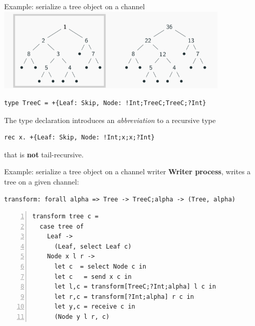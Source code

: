 \documentclass[10pt]{beamer}
\begin{document}
\begin{frame}[fragile]{Example:  serialize a tree object on a channel \hfill {}}
\pause
\vspace{-4cm}
\includegraphics[width=11cm]{img/treesumL}
\pause

\begin{lstlisting}
type TreeC = +{Leaf: Skip, Node: !Int;TreeC;TreeC;?Int}
\end{lstlisting}
The type declaration introduces an \emph{abbreviation} to a recursive
type
\begin{lstlisting}
rec x. +{Leaf: Skip, Node: !Int;x;x;?Int}
\end{lstlisting}
that is \textbf{not} tail-recursive.
\end{frame}

\newcommand\hlmarkerstyle[5][yellow]{%
    \draw [ line width = \baselineskip, #1 ] (#2, #3) -- (#4, #5);
}
\let\hldefaultstyle=\hlmarkerstyle

\begin{frame}[fragile]{Example:  serialize a tree object on a channel \hfill{\color{mLightBrown}writer}}
	\textbf{Writer process}, writes a tree on a given channel:
	
\begin{lstlisting}
transform: forall alpha => Tree -> TreeC;alpha -> (Tree, alpha)
\end{lstlisting}

\begin{lstlisting}[numbers=left, xleftmargin=0.7cm, escapeinside=\`\`]
transform tree c =
  case tree of
    Leaf ->
      (Leaf, select Leaf c)
    Node x l r ->
      let c  = select Node c in
      let c   = send x c in 
      let l,c = transform[TreeC;?Int;alpha] l c in
      let r,c = transform[?Int;alpha] r c in
      let y,c = receive c in
      (Node y l r, c)
\end{lstlisting}

\end{frame}
\end{document}

